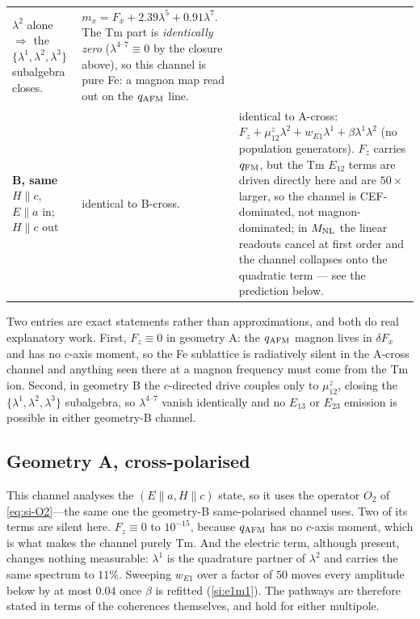 \documentclass[11pt]{article}
\newcommand{\qafm}{q_{\rm AFM}}
\newcommand{\qfm}{q_{\rm FM}}
\newcommand{\Mnl}{M_{\rm NL}}
\begin{document}
\begin{table}[h]
\begin{tabular}{p{2.1cm}p{5.2cm}p{7.4cm}}
  $\lambda^2$ alone $\Rightarrow$ the $\{\lambda^1,\lambda^2,\lambda^3\}$
  subalgebra closes.
& $m_x=F_x+2.39\lambda^5+0.91\lambda^7$.\newline
  The Tm part is \emph{identically zero} ($\lambda^{4\text{--}7}\equiv0$
  by the closure above), so this channel is pure Fe: a magnon map read
  out on the $\qafm$ line.\\
\textbf{B, same}\newline $H\!\parallel\!c$, $E\!\parallel\!a$ in;
$H\!\parallel\!c$ out
& identical to B-cross.
& identical to A-cross: $F_z+\mu^z_{12}\lambda^2
  +w_{E1}\lambda^1+\beta\lambda^1\lambda^2$ (no population
  generators).\newline
  $F_z$ carries $\qfm$, but the Tm $E_{12}$ terms are driven directly
  here and are $50\times$ larger, so the channel is CEF-dominated, not
  magnon-dominated; in $\Mnl$ the linear readouts cancel at first
  order and the channel collapses onto the quadratic term --- see the
  prediction below.\\
\bottomrule
\end{tabular}
\end{table}

Two entries are exact statements rather than approximations, and both do
real explanatory work.  First, $F_z\equiv0$ in geometry A: the $\qafm$
magnon lives in $\delta F_x$ and has no $c$-axis moment, so the Fe
sublattice is radiatively silent in the A-cross channel and anything
seen there at a magnon frequency must come from the Tm ion.  Second, in
geometry B the $c$-directed drive couples only to $\mu^z_{12}$, closing
the $\{\lambda^1,\lambda^2,\lambda^3\}$ subalgebra, so
$\lambda^{4\text{--}7}$ vanish identically and no $E_{13}$ or $E_{23}$
emission is possible in either geometry-B channel.

\subsection{Geometry A, cross-polarised}
\label{si:peaksAcross}

This channel analyses the $(E\!\parallel\!a,H\!\parallel\!c)$ state, so
it uses the operator $O_2$ of \cref{eq:si-O2}---the same one the
geometry-B same-polarised channel uses.  Two of its terms are silent
here.  $F_z\equiv0$ to $10^{-15}$, because $\qafm$ has no $c$-axis
moment, which is what makes the channel purely Tm.  And the electric
term, although present, changes nothing measurable: $\lambda^1$ is the
quadrature partner of $\lambda^2$ and carries the same spectrum to
$11\%$.  Sweeping
$w_{E1}$ over a factor of $50$ moves every amplitude below by at most
$0.04$ once $\beta$ is refitted (\cref{si:e1m1}).  The pathways are
therefore stated in terms of the coherences themselves, and hold for
either multipole.
\end{document}
